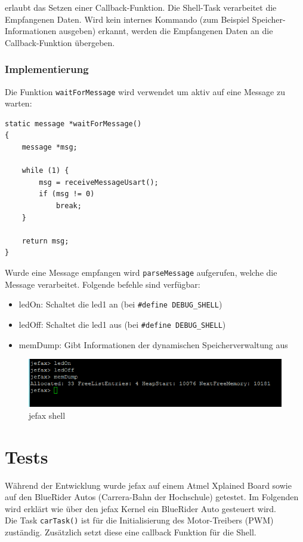 \documentclass[fontsize=12pt, toc=bibliography, notitlepage]{scrreprt}
\begin{document}
erlaubt das Setzen einer Callback-Funktion. Die Shell-Task verarbeitet die Empfangenen Daten. Wird kein internes Kommando (zum Beispiel Speicher-Informationen ausgeben) erkannt, werden die Empfangenen Daten an die Callback-Funktion übergeben.

\subsection{Implementierung}
Die Funktion \lstinline$waitForMessage$ wird verwendet um aktiv auf eine Message zu warten:

\begin{lstlisting}
static message *waitForMessage()
{
    message *msg;

    while (1) {
        msg = receiveMessageUsart();
        if (msg != 0)
            break;
    }

    return msg;
}
\end{lstlisting}

Wurde eine Message empfangen wird \lstinline$parseMessage$ aufgerufen, welche die Message verarbeitet. Folgende befehle sind verfügbar:

\begin{itemize}
	\item ledOn: Schaltet die led1 an (bei \lstinline$#define DEBUG_SHELL$)
	\item ledOff: Schaltet die led1 aus (bei \lstinline$#define DEBUG_SHELL$)
	\item memDump: Gibt Informationen der dynamischen Speicherverwaltung aus
\end{itemize}

\begin{figure}[H]
	\centering
	\includegraphics[width=450px]{images/shell.png}
	\caption{jefax shell}
	\label{fig:shell}
\end{figure}

\chapter{Tests}
\label{chap:tests}
Während der Entwicklung wurde jefax auf einem Atmel Xplained Board sowie auf den BlueRider Autos (Carrera-Bahn der Hochschule) getestet. Im Folgenden wird erklärt wie über den jefax Kernel ein BlueRider Auto gesteuert wird. \\Die Task \lstinline$carTask()$ ist für die Initialisierung des Motor-Treibers (PWM) zuständig. Zusätzlich setzt diese eine callback Funktion für die Shell.
\end{document}
